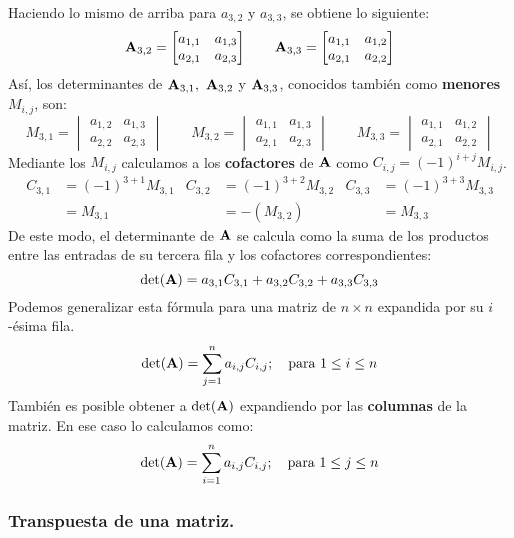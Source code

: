 \documentclass[12pt]{article}
\begin{document}
Haciendo lo mismo de arriba para $a_{3, 2}$ y $a_{3, 3}$, se obtiene lo siguiente:
\[
\mathbf{A}_{3, 2} =
\begin{bmatrix}
a_{1, 1} & a_{1, 3} \\
a_{2, 1} & a_{2, 3}
\end{bmatrix}
\quad \quad
\mathbf{A}_{3, 3} =
\begin{bmatrix}
a_{1, 1} & a_{1, 2} \\
a_{2, 1} & a_{2, 2}
\end{bmatrix}
\]
Así, los determinantes de $\mathbf{A}_{3, 1}, \ \mathbf{A}_{3, 2}$ y $\mathbf{A}_{3, 3}$, conocidos también como \textbf{menores} $M_{i, j}$, son:
\[
M_{3, 1} = 
\begin{vmatrix}
a_{1, 2} & a_{1, 3} \\
a_{2, 2} & a_{2, 3}
\end{vmatrix}
\quad \quad
M_{3, 2} = 
\begin{vmatrix}
a_{1, 1} & a_{1, 3} \\
a_{2, 1} & a_{2, 3}
\end{vmatrix}
\quad \quad
M_{3, 3} = 
\begin{vmatrix}
a_{1, 1} & a_{1, 2} \\
a_{2, 1} & a_{2, 2}
\end{vmatrix}
\]
Mediante los $M_{i, j}$ calculamos a los \textbf{cofactores} de $\mathbf{A}$ como $C_{i, j} = (-1)^{i + j} M_{i, j}$.
\begin{align*}
  C_{3, 1} &= (-1)^{3 + 1} M_{3, 1} & C_{3, 2} &= (-1)^{3 + 2} M_{3, 2} & C_{3, 3} &= (-1)^{3 + 3} M_{3, 3} \\
           &= M_{3, 1}              &          &= -(M_{3, 2})          &          &= M_{3, 3}
\end{align*}
De este modo, el determinante de $\mathbf{A}$ se calcula como la suma de los productos entre las entradas de su tercera fila y los cofactores correspondientes:
\[
  \det(\mathbf{A}) = a_{3, 1} C_{3, 1} + a_{3, 2} C_{3, 2} + a_{3, 3} C_{3, 3}
\]
Podemos generalizar esta fórmula para una matriz de $n \times n$ expandida por su $i$-ésima fila.
\[
  \det(\mathbf{A}) = \sum_{j = 1}^{n} a_{i, j} C_{i, j}; \quad \text{para } 1 \leq i \leq n
\]
También es posible obtener a $\det(\mathbf{A})$ expandiendo por las \textbf{columnas} de la matriz. En ese caso lo calculamos como:
\[
  \det(\mathbf{A}) = \sum_{i = 1}^{n} a_{i, j} C_{i, j}; \quad \text{para } 1 \leq j \leq n
\]

\subsubsection{Transpuesta de una matriz.}
\end{document}
